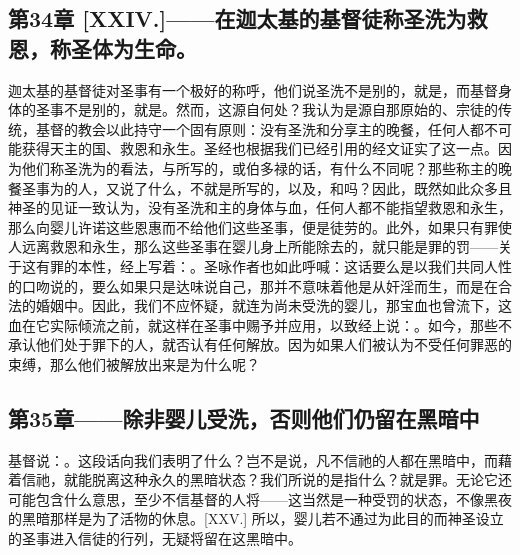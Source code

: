 
\subsection{第34章 [XXIV.]——在迦太基的基督徒称圣洗为救恩，称圣体为生命。}

迦太基的基督徒对圣事有一个极好的称呼，他们说圣洗不是别的，就是，而基督身体的圣事不是别的，就是。然而，这源自何处？我认为是源自那原始的、宗徒的传统，基督的教会以此持守一个固有原则：没有圣洗和分享主的晚餐，任何人都不可能获得天主的国、救恩和永生。圣经也根据我们已经引用的经文证实了这一点。因为他们称圣洗为的看法，与所写的，或伯多禄的话，有什么不同呢？那些称主的晚餐圣事为的人，又说了什么，不就是所写的，以及，和吗？因此，既然如此众多且神圣的见证一致认为，没有圣洗和主的身体与血，任何人都不能指望救恩和永生，那么向婴儿许诺这些恩惠而不给他们这些圣事，便是徒劳的。此外，如果只有罪使人远离救恩和永生，那么这些圣事在婴儿身上所能除去的，就只能是罪的罚——关于这有罪的本性，经上写着：。圣咏作者也如此呼喊：这话要么是以我们共同人性的口吻说的，要么如果只是达味说自己，那并不意味着他是从奸淫而生，而是在合法的婚姻中。因此，我们不应怀疑，就连为尚未受洗的婴儿，那宝血也曾流下，这血在它实际倾流之前，就这样在圣事中赐予并应用，以致经上说：。如今，那些不承认他们处于罪下的人，就否认有任何解放。因为如果人们被认为不受任何罪恶的束缚，那么他们被解放出来是为什么呢？\par


\subsection{第35章——除非婴儿受洗，否则他们仍留在黑暗中}

基督说：。这段话向我们表明了什么？岂不是说，凡不信祂的人都在黑暗中，而藉着信祂，就能脱离这种永久的黑暗状态？我们所说的是指什么？就是罪。无论它还可能包含什么意思，至少不信基督的人将——这当然是一种受罚的状态，不像黑夜的黑暗那样是为了活物的休息。[XXV.] 所以，婴儿若不通过为此目的而神圣设立的圣事进入信徒的行列，无疑将留在这黑暗中。\par

